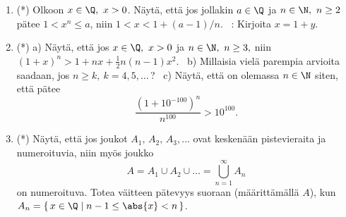 \begin{enumerate}
\item (*)
Olkoon $x\in\Q,\ x>0$. Näytä, että jos jollakin $a\in\Q$ ja $n\in\N,\ n \ge 2$ pätee 
$1 < x^n \le a$, niin $1 < x < 1+(a-1)/n$. \ : Kirjoita $x=1+y$.

\item (*) a) Näytä, että jos $x\in\Q,\ x> 0$ ja $n\in\N,\ n\ge 3,$ niin
$(1+x)^n > 1+nx+\frac 12 n(n-1)x^2.$ \ b) Millaisia vielä parempia arvioita saadaan, jos 
$n\ge k,\ k=4,5, \ldots$\,? \ c) Näytä, että on olemassa $n\in\N$ siten, että pätee
\[
\frac{(1+10^{-100})^n}{n^{100}} > 10^{100}.
\]

\item (*)
Näytä, että jos joukot $A_1,\,A_2,\,A_3, \ldots$ ovat keskenään pistevieraita ja numeroituvia,
niin myös joukko
\[
A = A_1 \cup A_2 \cup \ldots = \bigcup_{n=1}^\infty A_n
\]
on numeroituva. Totea väitteen pätevyys suoraan (määrittämällä $A$), kun 
$A_n=\{\,x\in\Q \mid n-1 \le \abs{x} < n\,\}$.

\end{enumerate}  